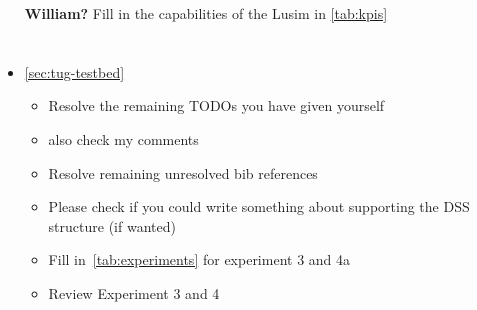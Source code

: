 \begin{itemize}
    \item[\textbf{William?}] Fill in the capabilities of the Lusim in \cref{tab:kpis}
\end{itemize}

\section*{\tug{}}
\begin{itemize}
    \item \cref{sec:tug-testbed}
    \begin{itemize}
        \item Resolve the remaining TODOs you have given yourself
        \item also check my comments
        \item Resolve remaining unresolved bib references
        \item Please check if you could write something about supporting the DSS structure (if wanted)
        \item Fill in~\cref{tab:experiments} for experiment 3 and 4a
        \item Review Experiment 3 and 4
    \end{itemize}
\end{itemize}





